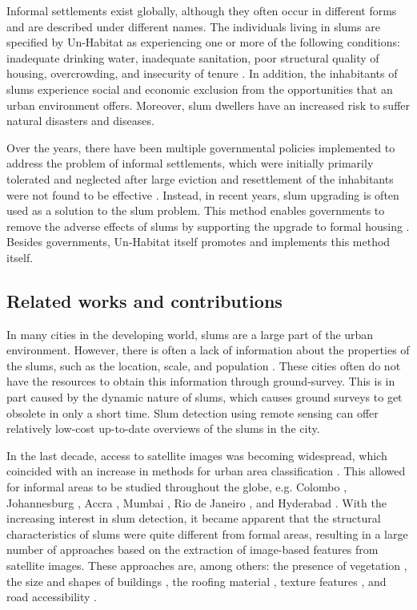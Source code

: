 Informal settlements exist globally, although they often occur in different forms and are described under different names. The individuals living in slums are specified by Un-Habitat as experiencing one or more of the following conditions: inadequate drinking water, inadequate sanitation, poor  structural quality of housing, overcrowding, and insecurity of tenure \cite{un2015slum}. In addition, the inhabitants of slums experience social and economic exclusion from the opportunities that an urban environment offers. Moreover, slum dwellers have an increased risk to suffer natural disasters and diseases. 

Over the years, there have been multiple governmental policies implemented to address the problem of informal settlements, which were initially primarily tolerated and neglected after large eviction and resettlement of the inhabitants were not found to be effective \cite{kuffer2016slums}. Instead, in recent years, slum upgrading is often used as a solution to the slum problem. This method enables governments to remove the adverse effects of slums by supporting the upgrade to formal housing \cite{cobbett2013cities}. Besides governments, Un-Habitat itself promotes and implements this method itself\cite{2015globact}.

\subsection{Related works and contributions}
In many cities in the developing world, slums are a large part of the urban environment. However, there is often a lack of information about the properties of the slums, such as the location, scale, and population \cite{kuffer2016slums}. These cities often do not have the resources to obtain this information through ground-survey. This is in part caused by the dynamic nature of slums, which causes ground surveys to get obsolete in only a short time. Slum detection using remote sensing can offer relatively low-cost up-to-date overviews of the slums in the city.

In the last decade, access to satellite images was becoming widespread, which coincided with an increase in methods for urban area classification \cite{kuffer2016slums}. This allowed for informal areas to be studied throughout the globe, e.g. Colombo \cite{colombo}, Johannesburg \cite{williams2016automatic}, Accra \cite{accra}, Mumbai \cite{mumbai}, Rio de Janeiro \cite{hofmann2008detecting}, and Hyderabad \cite{hyderabad}. With the increasing interest in slum detection, it became apparent that the structural characteristics of slums were quite different from formal areas, resulting in a large number of approaches based on the extraction of image-based features from satellite images. These approaches are, among others: the presence of vegetation \cite{niebergall2007object}, the size and shapes of buildings \cite{hofmann2008detecting}, the roofing material \cite{williams2016automatic}, texture features \cite{mattia2007exploiting}, and road accessibility \cite{owen2013approach}.

